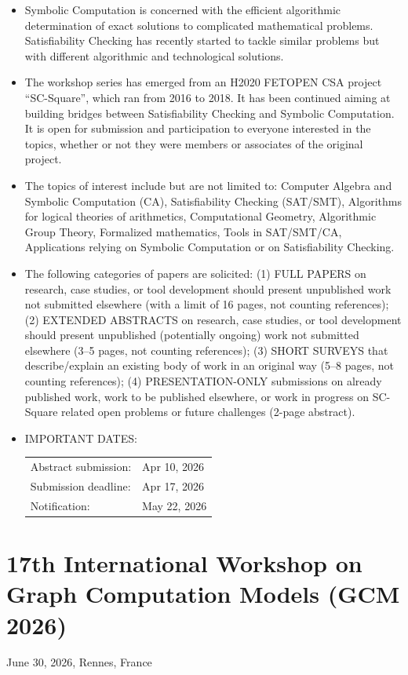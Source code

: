 \documentclass[prodmode,acmtecs]{acmsmall} %
\begin{document}
\begin{itemize}\item  Symbolic Computation is concerned with the efficient algorithmic determination of exact solutions to complicated mathematical problems. Satisfiability Checking has recently started to tackle similar problems but with different algorithmic and technological solutions. 
 
\item  The workshop series has emerged from an H2020 FETOPEN CSA project ``SC-Square'', which ran from 2016 to 2018. It has been continued aiming at building bridges between Satisfiability Checking and Symbolic Computation. It is open for submission and participation to everyone interested in the topics, whether or not they were members or associates of the original project. 
 
\item  The topics of interest include but are not limited to: Computer Algebra and Symbolic Computation (CA), Satisfiability Checking (SAT/SMT), Algorithms for logical theories of arithmetics, Computational Geometry, Algorithmic Group Theory, Formalized mathematics, Tools in SAT/SMT/CA, Applications relying on Symbolic Computation or on Satisfiability Checking. 
 
\item  The following categories of papers are solicited: (1) FULL PAPERS on research, case studies, or tool development should present unpublished work not submitted elsewhere (with a limit of 16 pages, not counting references); (2) EXTENDED ABSTRACTS on research, case studies, or tool development should present unpublished (potentially ongoing) work not submitted elsewhere (3–5 pages, not counting references); (3) SHORT SURVEYS that describe/explain an existing body of work in an original way (5–8 pages, not counting references); (4) PRESENTATION-ONLY submissions on already published work, work to be published elsewhere, or work in progress on SC-Square related open problems or future challenges (2-page abstract). 
 
\item  IMPORTANT DATES:  
 
\begin{tabulary}{\linewidth}{LL}Abstract submission:  & Apr 10, 2026 \\
Submission deadline:  & Apr 17, 2026 \\
Notification:  & May 22, 2026 \\
\end{tabulary}
 
\end{itemize}\section{17th International Workshop on Graph Computation Models  (GCM 2026)}\label{17thInternationalWorkshoponGraphComputationModelsGCM2026}  June 30, 2026, Rennes, France\\ 
\end{document}
